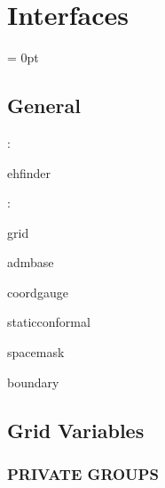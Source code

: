 
\section{Interfaces} 


\parskip = 0pt

\vspace{3mm} \subsection*{General}

: 

ehfinder
\vspace{2mm}

: 

grid

admbase

coordgauge

staticconformal

spacemask

boundary
\vspace{2mm}
\subsection*{Grid Variables}
\vspace{5mm}\subsubsection{PRIVATE GROUPS}

\vspace{5mm}

